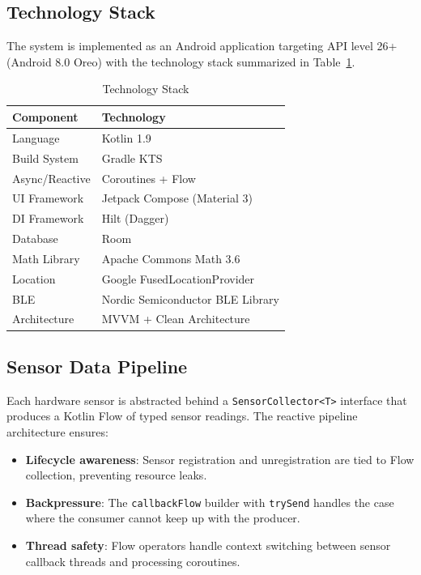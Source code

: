 \documentclass[journal,twocolumn]{IEEEtran}
\begin{document}
\subsection{Technology Stack}

The system is implemented as an Android application targeting API level 26+ (Android 8.0 Oreo) with the technology stack summarized in Table~\ref{tab:techstack}.

\begin{table}[htbp]
\caption{Technology Stack}
\label{tab:techstack}
\centering
\begin{tabular}{@{}ll@{}}
\toprule
\textbf{Component} & \textbf{Technology} \\
\midrule
Language & Kotlin 1.9 \\
Build System & Gradle KTS \\
Async/Reactive & Coroutines + Flow \\
UI Framework & Jetpack Compose (Material 3) \\
DI Framework & Hilt (Dagger) \\
Database & Room \\
Math Library & Apache Commons Math 3.6 \\
Location & Google FusedLocationProvider \\
BLE & Nordic Semiconductor BLE Library \\
Architecture & MVVM + Clean Architecture \\
\bottomrule
\end{tabular}
\end{table}

\subsection{Sensor Data Pipeline}

Each hardware sensor is abstracted behind a \texttt{SensorCollector<T>} interface that produces a Kotlin Flow of typed sensor readings. The reactive pipeline architecture ensures:

\begin{itemize}
    \item \textbf{Lifecycle awareness}: Sensor registration and unregistration are tied to Flow collection, preventing resource leaks.
    \item \textbf{Backpressure}: The \texttt{callbackFlow} builder with \texttt{trySend} handles the case where the consumer cannot keep up with the producer.
    \item \textbf{Thread safety}: Flow operators handle context switching between sensor callback threads and processing coroutines.
\end{itemize}
\end{document}
